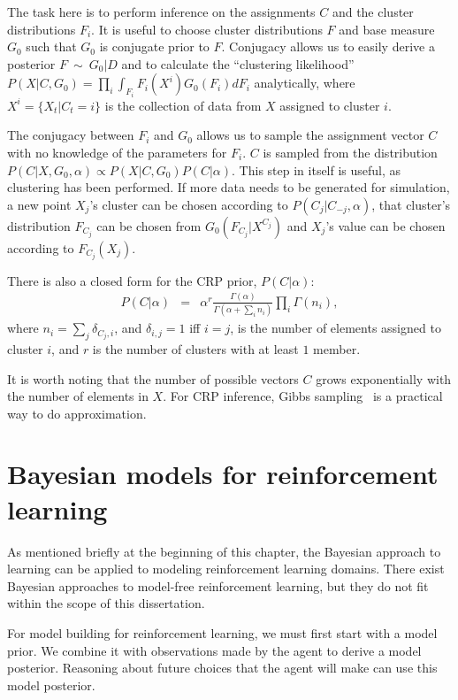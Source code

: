 The task here is to perform inference on the assignments $C$ and the cluster distributions $F_i$. It is useful to choose cluster distributions $F$ and base measure $G_0$ such that $G_0$ is conjugate prior to $F$. Conjugacy allows us to easily derive a posterior $F~\sim~G_0|D$ and to calculate the ``clustering likelihood'' $P(X|C,G_0)=\prod_i\int_{F_i} F_i(X^i)G_0(F_i)dF_i$ analytically, where $X^i=\{X_t|C_t=i\}$ is the collection of data from $X$ assigned to cluster $i$. 

The conjugacy between $F_i$ and $G_0$ allows us to sample the assignment vector $C$ with no knowledge of the parameters for $F_i$. $C$ is sampled from the distribution $P(C|X,G_0,\alpha)\propto P(X|C,G_0)P(C|\alpha)$. This step in itself is useful, as clustering has been performed. If more data needs to be generated for simulation, a new point $X_j$'s cluster can be chosen according to $P(C_j|C_{-j},\alpha)$, that cluster's distribution $F_{C_j}$ can be chosen from $G_0(F_{C_j}|X^{C_j})$ and $X_j$'s value can be chosen according to $F_{C_j}(X_j)$.

There is also a closed form for the CRP prior, $P(C|\alpha)$:
\begin{eqnarray}
P(C|\alpha)&=&\alpha^r \frac {\Gamma(\alpha)}{\Gamma(\alpha+\sum_i n_i)}\prod_i\Gamma(n_i),\label{eq:crp}
\end{eqnarray}
where $n_i = \sum_{j} \delta_{C_j,i}$, and $\delta_{i,j}=1$ iff $i=j$, is the number of elements assigned to cluster $i$, and $r$ is the number of clusters with at least $1$ member.

It is worth noting that the number of possible vectors $C$ grows exponentially with the number of elements in $X$. For CRP inference, Gibbs sampling~\cite{andrieu03,neal00} is a practical way to do approximation.

\section{Bayesian models for reinforcement learning}

As mentioned briefly at the beginning of this chapter, the Bayesian approach to learning can be applied to modeling reinforcement learning domains. There exist Bayesian approaches to model-free reinforcement learning, but they do not fit within the scope of this dissertation.

For model building for reinforcement learning, we must first start with a model prior. We combine it with observations made by the agent to derive a model posterior. Reasoning about future choices that the agent will make can use this model posterior.

